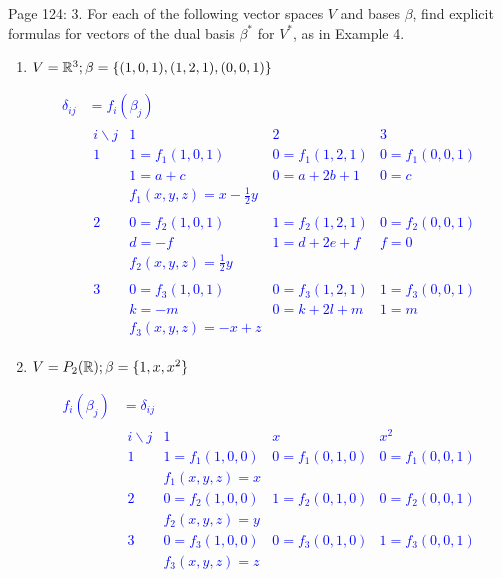 \documentclass[10pt,a4paper]{report}
\newcommand{\BLUE}[1]{\textcolor{blue}{#1}}
\begin{document}
\noindent Page 124: 3. For each of the following vector spaces $V$ and bases $\beta$, find explicit formulas for vectors of the dual basis $\beta^*$ for $V^*$, as in Example 4.
\begin{enumerate}[label=(\alph*)]
	\item $V = \mathbb{R}^3; \beta=\{(1,0,1),(1,2,1),(0,0,1)\}$
	
	\BLUE{\begin{align*}
		\delta_{ij} &= f_i(\beta_j) \\
		&\begin{array}{cccc}
			i\backslash j & 1            & 2 & 3 \\
			1 & 1 = f_1(1,0,1) & 0=f_1(1,2,1) & 0=f_1 (0,0,1)\\
			  & 1 = a+c        & 0= a+2b+1 & 0=c \\
			  & f_1(x,y,z) = x-\frac{1}{2}y\\ \\
			2 & 0 = f_2(1,0,1) & 1=f_2(1,2,1) & 0=f_2 (0,0,1)\\
			  & d=-f & 1=d+2e+f & f=0 \\
			  & f_2(x,y,z) = \frac{1}{2}y \\ \\
			3 & 0 = f_3(1,0,1) & 0=f_3(1,2,1) & 1=f_3 (0,0,1)\\
			  & k = -m & 0=k+2l+m & 1=m \\
			  & f_3(x,y,z) = -x+z
		\end{array}
	\end{align*}
	}	
	
	\item $V=P_2(\mathbb{R}); \beta=\{1,x,x^2\}$
	
	\BLUE{\begin{align*}
		f_i(\beta_j) &= \delta_{ij}\\
		&\begin{array}{cccc}
		i\backslash j & 1 & x & x^2 \\
		1  & 1= f_1(1,0,0) & 0=f_1(0,1,0) & 0=f_1(0,0,1)\\
		   & f_1(x,y,z) = x \\
		2  & 0= f_2(1,0,0) & 1=f_2(0,1,0) & 0=f_2(0,0,1)\\
		   & f_2(x,y,z) = y \\
		3  & 0= f_3(1,0,0) & 0=f_3(0,1,0) & 1=f_3(0,0,1) \\
		   & f_3(x,y,z) = z
		\end{array}
	\end{align*}
	}

\end{enumerate}
\end{document}
